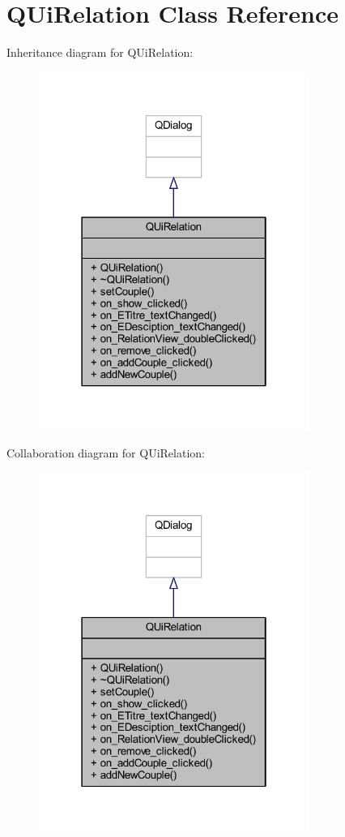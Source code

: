 \hypertarget{class_q_ui_relation}{}\section{Q\+Ui\+Relation Class Reference}
\label{class_q_ui_relation}


Inheritance diagram for Q\+Ui\+Relation\+:\nopagebreak
\begin{figure}[H]
\begin{center}
\leavevmode
\includegraphics[width=250pt]{class_q_ui_relation__inherit__graph}
\end{center}
\end{figure}


Collaboration diagram for Q\+Ui\+Relation\+:\nopagebreak
\begin{figure}[H]
\begin{center}
\leavevmode
\includegraphics[width=250pt]{class_q_ui_relation__coll__graph}
\end{center}
\end{figure}
